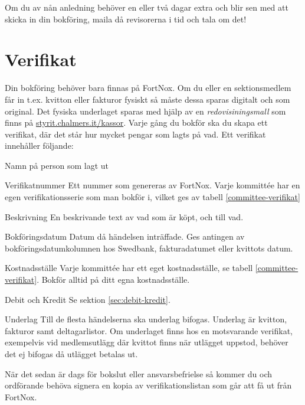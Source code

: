 \documentclass{article}
\begin{document}
Om du av nån anledning behöver en eller två dagar extra och blir sen med att skicka in din bokföring, maila då revisorerna i tid och tala om det!

\newpage
\section{Verifikat}
Din bokföring behöver bara finnas på FortNox. Om du eller en sektionsmedlem får in t.ex. kvitton eller fakturor fysiskt så måste dessa sparas digitalt och som original. Det fysiska underlaget sparas med hjälp av en \textit{redovisiningsmall} som finns på \url{styrit.chalmers.it/kassor}. Varje gång du bokför ska du skapa ett verifikat, där det står hur mycket pengar som lagts på vad. Ett verifikat innehåller följande: 

\begin{labeling}{Namn på person som lagt ut}
    \item[Verifikatnummer] Ett nummer som genereras av FortNox. Varje kommittée har en egen verifikationsserie som man bokför i, vilket ges av tabell \ref{committee-verifikat}
    \item[Beskrivning] En beskrivande text av vad som är köpt, och till vad.
    \item[Bokföringsdatum] Datum då händelsen inträffade. Ges antingen av bokföringsdatumkolumnen hos Swedbank, fakturadatumet eller kvittots datum. 
    \item[Kostnadsställe] Varje kommittée har ett eget kostnadsställe, se tabell \ref{committee-verifikat}. Bokför alltid på ditt egna kostnadsställe. 
    \item[Debit och Kredit] Se sektion \ref{sec:debit-kredit}.  
    \item [Underlag] Till de flesta händelserna ska underlag bifogas. Underlag är kvitton, fakturor samt deltagarlistor. Om underlaget finns hos en motsvarande verifikat, exempelvis vid medlemsutlägg där kvittot finns när utlägget uppstod, behöver det ej bifogas då utlägget betalas ut. 
\end{labeling}

När det sedan är dags för bokslut eller ansvarsbefrielse så kommer du och ordförande behöva signera en kopia av verifikationslistan som går att få ut från FortNox.


\end{document}
